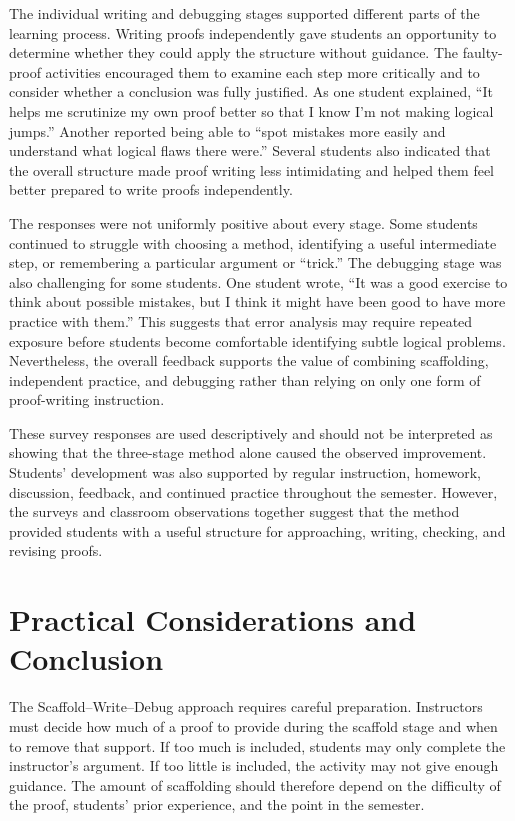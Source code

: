 \documentclass[12pt]{article}
\begin{document}
The individual writing and debugging stages supported different parts of the learning process. Writing proofs independently gave students an opportunity to determine whether they could apply the structure without guidance. The faulty-proof activities encouraged them to examine each step more critically and to consider whether a conclusion was fully justified. As one student explained, ``It helps me scrutinize my own proof better so that I know I'm not making logical jumps.'' Another reported being able to ``spot mistakes more easily and understand what logical flaws there were.'' Several students also indicated that the overall structure made proof writing less intimidating and helped them feel better prepared to write proofs independently.

The responses were not uniformly positive about every stage. Some students continued to struggle with choosing a method, identifying a useful intermediate step, or remembering a particular argument or ``trick.'' The debugging stage was also challenging for some students. One student wrote, ``It was a good exercise to think about possible mistakes, but I think it might have been good to have more practice with them.'' This suggests that error analysis may require repeated exposure before students become comfortable identifying subtle logical problems. Nevertheless, the overall feedback supports the value of combining scaffolding, independent practice, and debugging rather than relying on only one form of proof-writing instruction.

These survey responses are used descriptively and should not be interpreted as showing that the three-stage method alone caused the observed improvement. Students' development was also supported by regular instruction, homework, discussion, feedback, and continued practice throughout the semester. However, the surveys and classroom observations together suggest that the method provided students with a useful structure for approaching, writing, checking, and revising proofs.

\section{Practical Considerations and Conclusion}

The Scaffold--Write--Debug approach requires careful preparation. Instructors must decide how much of a proof to provide during the scaffold stage and when to remove that support. If too much is included, students may only complete the instructor's argument. If too little is included, the activity may not give enough guidance. The amount of scaffolding should therefore depend on the difficulty of the proof, students' prior experience, and the point in the semester.
\end{document}
